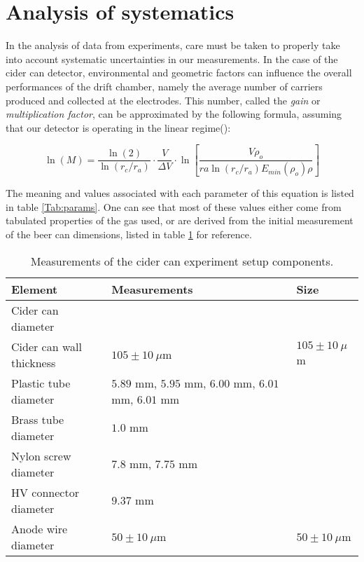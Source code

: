 \section{Analysis of systematics}
In the analysis of data from experiments, care must be taken to properly take into account systematic uncertainties in our measurements. In the case of the cider can detector, environmental and geometric factors can influence the overall performances of the drift chamber, namely the average number of carriers produced and collected at the electrodes. This number, called the \textit{gain} or \textit{multiplication factor}, can be approximated by the following formula, assuming that our detector is operating in the linear regime(\cite{gas_detect}):

\begin{equation}
  \label{eq:lnm}
  \ln(M)=\frac{\ln(2)}{\ln(r_{c}/r_{a})}\cdot\frac{V}{\Delta V}\cdot\ln\left[ \frac{V\rho_{o}}{ra\ln(r_{c}/r_{a})E_{min}(\rho_{o})\rho}\right]
\end{equation}

The meaning and values associated with each parameter of this equation is listed in table \ref{Tab:params}. One can see that most of these values either come from tabulated properties of the gas used, or are derived from the initial measurement of the beer can dimensions, listed in table \ref{Tab:cidercan_sizes} for reference. 

\begin{table}[htb]
	\begin{tabularx}{\linewidth}{X|X|p{2cm}}
			\textbf{Element}         & \textbf{Measurements}                                 & \textbf{Size}       \\ \hline
			Cider can diameter       &                                                       &                     \\
			Cider can wall thickness & $105 \pm 10 \ \mu$m                                   & $105 \pm 10 \ \mu$m \\
			Plastic tube diameter    & $5.89$ mm, $5.95$ mm, $6.00$ mm, $6.01$ mm, $6.01$ mm &                     \\
			Brass tube diameter      & $1.0$ mm                                              &                     \\
			Nylon screw diameter     & $7.8$ mm, $7.75$ mm                                   &                     \\
			HV connector diameter    & $9.37$ mm                                             &                     \\
			Anode wire diameter      & $50 \pm 10 \ \mu$m                                    & $50 \pm 10 \ \mu$m 
	\end{tabularx}
\caption{Measurements of the cider can experiment setup components.}
\label{Tab:cidercan_sizes}
\end{table}


